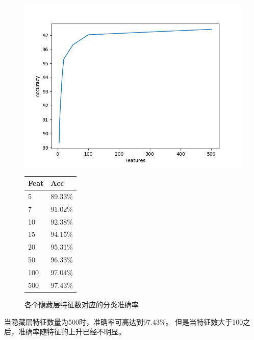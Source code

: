 \documentclass{article}
\begin{document}
\begin{figure}[H]
    \begin{minipage}[H]{0.7\linewidth}
        \centering
        \includegraphics[width=\textwidth]{figures/fig_03.png}
    \end{minipage}
    \begin{minipage}[H]{0.2\linewidth}
        \centering
        \begin{tabular}{ll}
            \hline
            \textbf{Feat} & \textbf{Acc} \\
            \hline
            5             & 89.33\%      \\
            7             & 91.02\%      \\
            10            & 92.38\%      \\
            15            & 94.15\%      \\
            20            & 95.31\%      \\
            50            & 96.33\%      \\
            100           & 97.04\%      \\
            500           & 97.43\%      \\
            \hline
        \end{tabular}
    \end{minipage}
    \caption{各个隐藏层特征数对应的分类准确率}
    \label{hidden-features-acc}
\end{figure}

当隐藏层特征数量为500时，准确率可高达到97.43\%。
但是当特征数大于100之后，准确率随特征的上升已经不明显。
\end{document}
